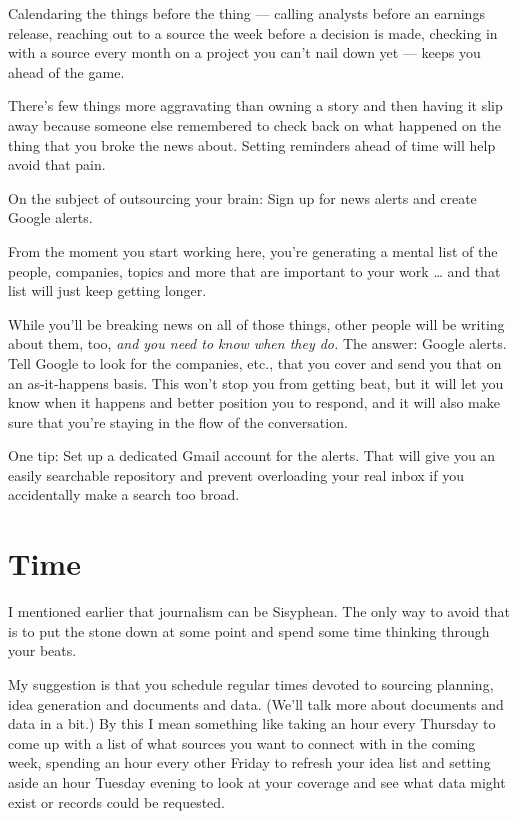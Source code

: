 \documentclass[
  11pt,
  american,
  letterpaperpaper,
  extrafontsizes,onecolumn,openright
  ]{memoir}
\begin{document}
Calendaring the things before the thing --- calling analysts before an earnings release, reaching out to a source the week before a decision is made, checking in with a source every month on a project you can't nail down yet --- keeps you ahead of the game.

There's few things more aggravating than owning a story and then having it slip away because someone else remembered to check back on what happened on the thing that you broke the news about. Setting reminders ahead of time will help avoid that pain.

On the subject of outsourcing your brain: Sign up for news alerts and create Google alerts.

From the moment you start working here, you're generating a mental list of the people, companies, topics and more that are important to your work \ldots{} and that list will just keep getting longer.

While you'll be breaking news on all of those things, other people will be writing about them, too, \emph{and you need to know when they do.} The answer: Google alerts. Tell Google to look for the companies, etc., that you cover and send you that on an as-it-happens basis. This won't stop you from getting beat, but it will let you know when it happens and better position you to respond, and it will also make sure that you're staying in the flow of the conversation.

One tip: Set up a dedicated Gmail account for the alerts. That will give you an easily searchable repository and prevent overloading your real inbox if you accidentally make a search too broad.

\hypertarget{time}{%
\section*{Time}\label{time}}

I mentioned earlier that journalism can be Sisyphean. The only way to avoid that is to put the stone down at some point and spend some time thinking through your beats.

My suggestion is that you schedule regular times devoted to sourcing planning, idea generation and documents and data. (We'll talk more about documents and data in a bit.) By this I mean something like taking an hour every Thursday to come up with a list of what sources you want to connect with in the coming week, spending an hour every other Friday to refresh your idea list and setting aside an hour Tuesday evening to look at your coverage and see what data might exist or records could be requested.
\end{document}
